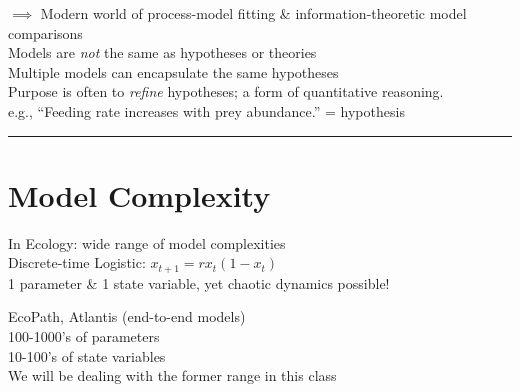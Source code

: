 \documentclass{article}
\begin{document}
$\implies$ Modern world of process-model fitting \& information-theoretic model comparisons\\

Models are \textit{not} the same as hypotheses or theories\\
Multiple models can encapsulate the same hypotheses\\
Purpose is often to \textit{refine} hypotheses; a form of quantitative reasoning.\\

e.g., ``Feeding rate increases with prey abundance.'' = hypothesis

\rule[0.5ex]{\linewidth}{1pt}

\pagebreak

\section*{Model Complexity}

In Ecology: wide range of model complexities\\

\-\hspace{1cm} Discrete-time Logistic: $x_{t+1} = r x_t(1-x_t)$ \\
\-\hspace{1cm} \-\hspace{1cm}  1 parameter \& 1 state variable, yet chaotic dynamics possible!

\-\hspace{1cm} EcoPath, Atlantis (end-to-end models)\\
\-\hspace{1cm} \-\hspace{1cm} 100-1000's of parameters\\
\-\hspace{1cm} \-\hspace{1cm} 10-100's of state variables\\

We will be dealing with the former range in this class
\end{document}
